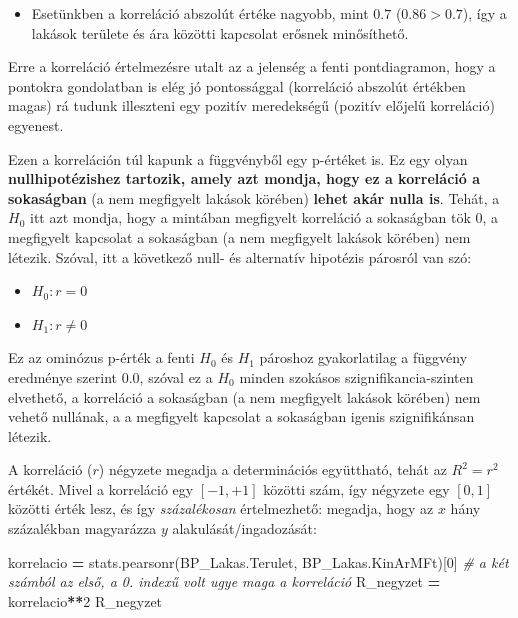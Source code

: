 \documentclass[
]{book}
\newenvironment{Shaded}{\begin{snugshade}}{\end{snugshade}}
\newcommand{\CommentTok}[1]{\textcolor[rgb]{0.56,0.35,0.01}{\textit{#1}}}
\newcommand{\DecValTok}[1]{\textcolor[rgb]{0.00,0.00,0.81}{#1}}
\newcommand{\NormalTok}[1]{#1}
\newcommand{\OperatorTok}[1]{\textcolor[rgb]{0.81,0.36,0.00}{\textbf{#1}}}
\providecommand{\tightlist}{%
  \setlength{\itemsep}{0pt}\setlength{\parskip}{0pt}}
\begin{document}
\begin{itemize}
\tightlist
\item
  Esetünkben a korreláció abszolút értéke nagyobb, mint \(0.7\) (\(0.86>0.7\)), így a lakások területe és ára közötti kapcsolat erősnek minősíthető.
\end{itemize}

Erre a korreláció értelmezésre utalt az a jelenség a fenti pontdiagramon, hogy a pontokra gondolatban is elég jó pontossággal (korreláció abszolút értékben magas) rá tudunk illeszteni egy pozitív meredekségű (pozitív előjelű korreláció) egyenest.

Ezen a korreláción túl kapunk a függvényből egy p-értéket is. Ez egy olyan \textbf{nullhipotézishez tartozik, amely azt mondja, hogy ez a korreláció a sokaságban} (a nem megfigyelt lakások körében) \textbf{lehet akár nulla is}. Tehát, a \(H_0\) itt azt mondja, hogy a mintában megfigyelt korreláció a sokaságban tök \(0\), a megfigyelt kapcsolat a sokaságban (a nem megfigyelt lakások körében) nem létezik. Szóval, itt a következő null- és alternatív hipotézis párosról van szó:

\begin{itemize}
\tightlist
\item
  \(H_0:r=0\)
\item
  \(H_1:r\neq0\)
\end{itemize}

Ez az ominózus p-érték a fenti \(H_0\) és \(H_1\) pároshoz gyakorlatilag a függvény eredménye szerint \(0.0\), szóval ez a \(H_0\) minden szokásos szignifikancia-szinten elvethető, a korreláció a sokaságban (a nem megfigyelt lakások körében) nem vehető nullának, a a megfigyelt kapcsolat a sokaságban igenis szignifikánsan létezik.

A korreláció (\(r\)) négyzete megadja a determinációs együttható, tehát az \(R^2=r^2\) értékét. Mivel a korreláció egy \([-1,+1]\) közötti szám, így négyzete egy \([0,1]\) közötti érték lesz, és így \emph{százalékosan} értelmezhető: megadja, hogy az \(x\) hány százalékban magyarázza \(y\) alakulását/ingadozását:

\begin{Shaded}
\begin{Highlighting}[]
\NormalTok{korrelacio }\OperatorTok{=}\NormalTok{ stats.pearsonr(BP\_Lakas.Terulet, BP\_Lakas.KinArMFt)[}\DecValTok{0}\NormalTok{] }\CommentTok{\# a két számból az első, a 0. indexű volt ugye maga a korreláció}
\NormalTok{R\_negyzet }\OperatorTok{=}\NormalTok{ korrelacio}\OperatorTok{**}\DecValTok{2}
\NormalTok{R\_negyzet}
\end{Highlighting}
\end{Shaded}
\end{document}
